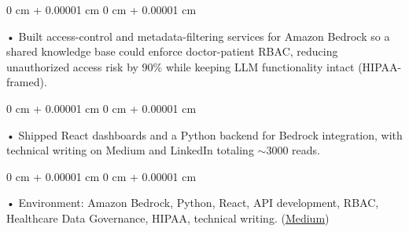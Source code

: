 \documentclass[10pt, letterpaper]{article}
\newenvironment{onecolentry}{
    \begin{adjustwidth}{
        0 cm + 0.00001 cm
    }{
        0 cm + 0.00001 cm
    }
}{
    \end{adjustwidth}
} %
\begin{document}
        \begin{onecolentry}
             • Built access-control and metadata-filtering services for Amazon Bedrock so a shared knowledge base could enforce doctor-patient RBAC, reducing unauthorized access risk by 90\% while keeping LLM functionality intact (HIPAA-framed).
        \end{onecolentry}
        \begin{onecolentry}
             • Shipped React dashboards and a Python backend for Bedrock integration, with technical writing on Medium and LinkedIn totaling $\sim$3000 reads.
        \end{onecolentry}
        \begin{onecolentry}
             • Environment: Amazon Bedrock, Python, React, API development, RBAC, Healthcare Data Governance, HIPAA, technical writing. (\href{https://medium.com/@sreenikethaathreya/building-a-permission-aware-genai-application-on-amazon-bedrock-8fdc2410dd43}{Medium})
        \end{onecolentry}

\vspace{0.4cm}
\end{document}
